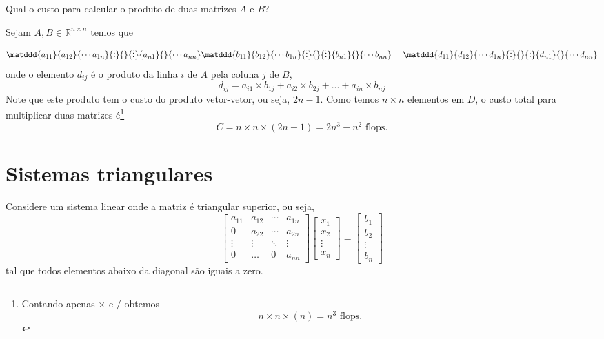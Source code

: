 \begin{ex}
Qual o custo para calcular o produto de duas matrizes  $A$ e $B$?
\end{ex}
\begin{sol}
Sejam $A, B \in \mathbb{R}^{n\times n}$ temos que
\begin{equation}
  \matddd{a_{11}}{a_{12}}{\cdots a_{1n}}{\vdots}{}{\vdots}{a_{n1}}{}{\cdots a_{nn}}
  \matddd{b_{11}}{b_{12}}{\cdots b_{1n}}{\vdots}{}{\vdots}{b_{n1}}{}{\cdots b_{nn}}
 =\matddd{d_{11}}{d_{12}}{\cdots d_{1n}}{\vdots}{}{\vdots}{d_{n1}}{}{\cdots d_{nn}}
\end{equation}
onde o elemento $d_{ij}$ é o produto da linha $i$ de $A$ pela coluna $j$ de $B$,
\begin{equation}
  d_{ij}=  a_{i1}\times b_{1j} + a_{i2}\times b_{2j} +...+a_{in}\times b_{nj}
\end{equation}
Note que este produto tem o custo do produto vetor-vetor, ou seja, $2n-1$. Como temos $n\times n$ elementos em $D$, o custo total para multiplicar duas matrizes é\footnote{Contando apenas $\times$ e $/$ obtemos
\begin{equation}
  n\times n \times(n)  = n^3 \text{~flops.}
\end{equation}
}
\begin{equation}
  C= n\times n \times (2n-1)= 2n^3-n^2 \text{~flops.}
\end{equation}

\end{sol}


\section{Sistemas triangulares}
Considere um sistema linear onde a matriz é triangular superior, ou seja,
\begin{equation}\begin{bmatrix}
a_{11} & a_{12} & \cdots & a_{1n}\\
0      & a_{22} & \cdots & a_{2n}\\
\vdots & \vdots & \ddots & \vdots\\
0      & \dots  & 0     & a_{nn}
\end{bmatrix}
\begin{bmatrix}
x_{1} \\
x_{2} \\
\vdots \\
x_{n}
\end{bmatrix}
 =\begin{bmatrix}
b_{1} \\
b_{2} \\
\vdots \\
b_{n}
\end{bmatrix}
\end{equation}
tal que todos elementos abaixo da diagonal são iguais a zero.

